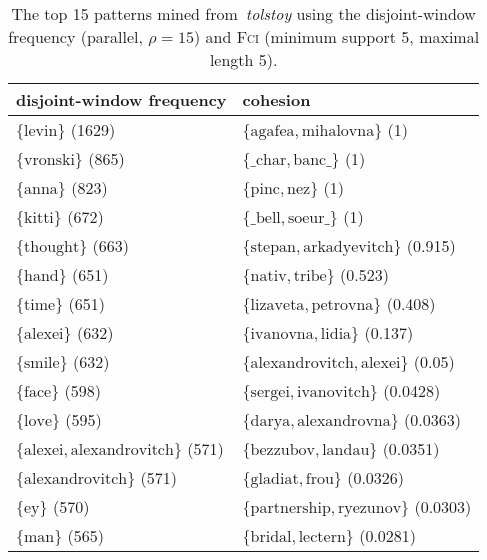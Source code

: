 \begin{table}
\centering

\begin{tabulary}{\textwidth}{L|L}

disjoint-window frequency & cohesion \\
\hline
$ \{ \text{levin} \} $ (1629) & $ \{ \text{agafea}, \text{mihalovna} \} $ (1) \\
$ \{ \text{vronski} \} $ (865) & $ \{ \text{\_char}, \text{banc\_} \} $ (1) \\
$ \{ \text{anna} \} $ (823) & $ \{ \text{pinc}, \text{nez} \} $ (1) \\
$ \{ \text{kitti} \} $ (672) & $ \{ \text{\_bell}, \text{soeur\_} \} $ (1) \\
$ \{ \text{thought} \} $ (663) & $ \{ \text{stepan}, \text{arkadyevitch} \} $ (0.915) \\
$ \{ \text{hand} \} $ (651) & $ \{ \text{nativ}, \text{tribe} \} $ (0.523) \\
$ \{ \text{time} \} $ (651) & $ \{ \text{lizaveta}, \text{petrovna} \} $ (0.408) \\
$ \{ \text{alexei} \} $ (632) & $ \{ \text{ivanovna}, \text{lidia} \} $ (0.137) \\
$ \{ \text{smile} \} $ (632) & $ \{ \text{alexandrovitch}, \text{alexei} \} $ (0.05) \\
$ \{ \text{face} \} $ (598) & $ \{ \text{sergei}, \text{ivanovitch} \} $ (0.0428) \\
$ \{ \text{love} \} $ (595) & $ \{ \text{darya}, \text{alexandrovna} \} $ (0.0363) \\
$ \{ \text{alexei}, \text{alexandrovitch} \} $ (571) & $ \{ \text{bezzubov}, \text{landau} \} $ (0.0351) \\
$ \{ \text{alexandrovitch} \} $ (571) & $ \{ \text{gladiat}, \text{frou} \} $ (0.0326) \\
$ \{ \text{ey} \} $ (570) & $ \{ \text{partnership}, \text{ryezunov} \} $ (0.0303) \\
$ \{ \text{man} \} $ (565) & $ \{ \text{bridal}, \text{lectern} \} $ (0.0281) \\

\end{tabulary}

\caption{The top 15 patterns mined from~\emph{tolstoy} using the disjoint-window frequency (parallel, $ \rho = 15 $) and \textsc{Fci} (minimum support 5, maximal length 5).}
\end{table}

